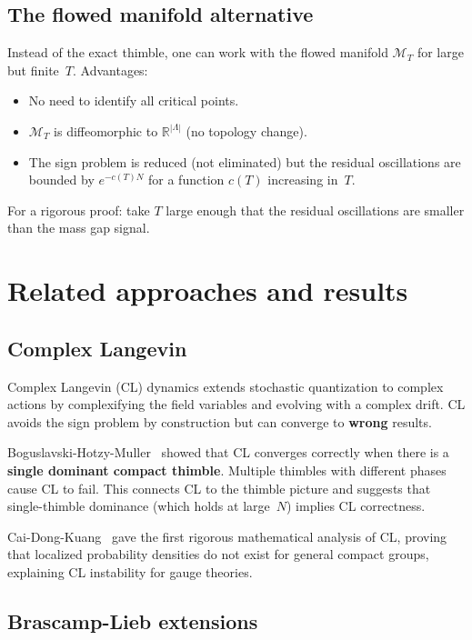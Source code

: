 \documentclass[12pt]{article}
\theoremstyle{definition}
\theoremstyle{remark}
\newcommand{\R}{\mathbb{R}}
\newcommand{\La}{\Lambda}
\begin{document}
\subsection{The flowed manifold alternative}

Instead of the exact thimble, one can work with the flowed manifold
$\mathcal{M}_T$ for large but finite~$T$. Advantages:
\begin{itemize}
\item No need to identify all critical points.
\item $\mathcal{M}_T$ is diffeomorphic to $\R^{|\La|}$ (no topology
  change).
\item The sign problem is reduced (not eliminated) but the residual
  oscillations are bounded by $e^{-c(T)N}$ for a function $c(T)$
  increasing in~$T$.
\end{itemize}
For a rigorous proof: take $T$ large enough that the residual
oscillations are smaller than the mass gap signal.

\section{Related approaches and results}

\subsection{Complex Langevin}

Complex Langevin (CL) dynamics extends stochastic quantization to
complex actions by complexifying the field variables and evolving
with a complex drift. CL avoids the sign problem by construction
but can converge to \textbf{wrong} results.

Boguslavski-Hotzy-Muller~\cite{BHM25} showed that CL converges
correctly when there is a \textbf{single dominant compact thimble}.
Multiple thimbles with different phases cause CL to fail. This
connects CL to the thimble picture and suggests that single-thimble
dominance (which holds at large~$N$) implies CL correctness.

Cai-Dong-Kuang~\cite{CDK20} gave the first rigorous mathematical
analysis of CL, proving that localized probability densities do not
exist for general compact groups, explaining CL instability for
gauge theories.

\subsection{Brascamp-Lieb extensions}
\end{document}
